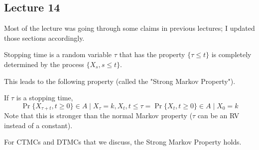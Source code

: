 \subsection{Lecture 14}

Most of the lecture was going through some claims in previous lectures; I updated those sections accordingly.

\begin{definition}
    Stopping time is a random variable $\tau$ that has the property
    $\{ \tau \leq t \}$ is completely determined by the process $\{ X_s, s \leq t \}$.
\end{definition}

This leads to the following property (called the "Strong Markov Property").

\begin{theorem}
    If $\tau$ is a stopping time,
    \[ \Pr{\{X_{\tau + t}, t \geq 0\} \in A \mid X_{\tau} = k, X_t, t \leq \tau} = \Pr{\{X_t, t \geq 0\} \in A \mid X_0 = k}\]
    Note that this is stronger than the normal Markov property ($\tau$ can be an RV instead of a constant).
\end{theorem}

For CTMCs and DTMCs that we discuss, the Strong Markov Property holds.